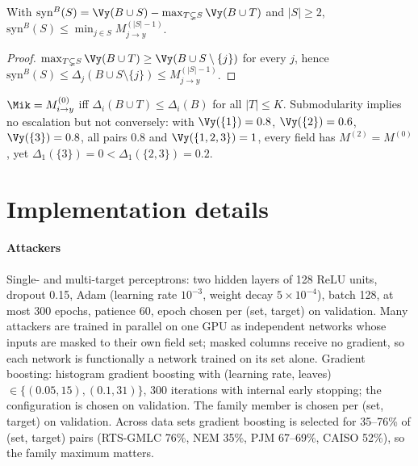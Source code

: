 \begin{proposition}\label{prop:syn}
With $\mathrm{syn}^B(S)=\Vy(B\cup S)-\max_{T\subsetneq S}\Vy(B\cup T)$ and $|S|\ge 2$,
$\mathrm{syn}^B(S)\le\min_{j\in S}M^{(|S|-1)}_{j\to y}$.
\end{proposition}
\begin{proof}
$\max_{T\subsetneq S}\Vy(B\cup T)\ge\Vy(B\cup S\setminus\{j\})$ for every $j$, hence
$\mathrm{syn}^B(S)\le\Delta_j(B\cup S\setminus\{j\})\le M^{(|S|-1)}_{j\to y}$.
\end{proof}

\begin{remark}
$\Mik=M^{(0)}_{i\to y}$ iff $\Delta_i(B\cup T)\le\Delta_i(B)$ for all $|T|\le K$. Submodularity implies no
escalation but not conversely: with $\Vy(\{1\})=0.8$, $\Vy(\{2\})=0.6$, $\Vy(\{3\})=0.8$, all pairs $0.8$
and $\Vy(\{1,2,3\})=1$, every field has $M^{(2)}=M^{(0)}$, yet $\Delta_1(\{3\})=0<\Delta_1(\{2,3\})=0.2$.
\end{remark}

\section{Implementation details}\label{app:impl}

\paragraph{Attackers} Single- and multi-target perceptrons: two hidden layers of 128 ReLU units,
dropout 0.15, Adam (learning rate $10^{-3}$, weight decay $5\times10^{-4}$), batch 128, at most 300
epochs, patience 60, epoch chosen per (set, target) on validation. Many attackers are trained in
parallel on one GPU as independent networks whose inputs are masked to their own field set; masked
columns receive no gradient, so each network is functionally a network trained on its set alone.
Gradient boosting: histogram gradient boosting with (learning rate, leaves) $\in\{(0.05,15),(0.1,31)\}$,
300 iterations with internal early stopping; the configuration is chosen on validation. The family
member is chosen per (set, target) on validation. Across data sets gradient boosting is selected for
35--76\% of (set, target) pairs (RTS-GMLC 76\%, NEM 35\%, PJM 67--69\%, CAISO 52\%), so the family maximum matters.

